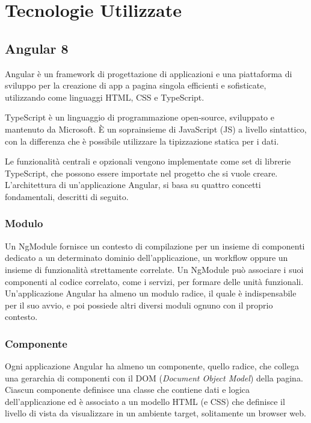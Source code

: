 \appendix

\chapter{Tecnologie Utilizzate} \label{appendix:a}

\section{Angular 8} \label{appendix:angular}
Angular è un framework di progettazione di applicazioni e una piattaforma di sviluppo per la creazione di app a pagina singola efficienti e sofisticate, utilizzando come linguaggi HTML, CSS e TypeScript. 

TypeScript è un linguaggio di programmazione open-source, sviluppato e mantenuto da Microsoft. È un soprainsieme di JavaScript (JS) a livello sintattico, con la differenza che è possibile utilizzare la tipizzazione statica per i dati.

Le funzionalità centrali e opzionali vengono implementate come set di librerie TypeScript, che possono essere importate nel progetto che si vuole creare. L'architettura di un'applicazione Angular, si basa su quattro concetti fondamentali, descritti di seguito.

\subsection{Modulo}
Un NgModule fornisce un contesto di compilazione per un insieme di componenti dedicato a un determinato dominio dell'applicazione, un workflow oppure un insieme di funzionalità strettamente correlate. Un NgModule può associare i suoi componenti al codice correlato, come i servizi, per formare delle unità funzionali. Un'applicazione Angular ha almeno un modulo radice, il quale è indispensabile per il suo avvio, e poi possiede altri diversi moduli ognuno con il proprio contesto.

\subsection{Componente}    
Ogni applicazione Angular ha almeno un componente, quello radice, che collega una gerarchia di componenti con il DOM (\textit{Document Object Model}) della pagina. Ciascun componente definisce una classe che contiene dati e logica dell'applicazione ed è associato a un modello HTML (e CSS) che definisce il livello di vista da visualizzare in un ambiente target, solitamente un browser web.
    
